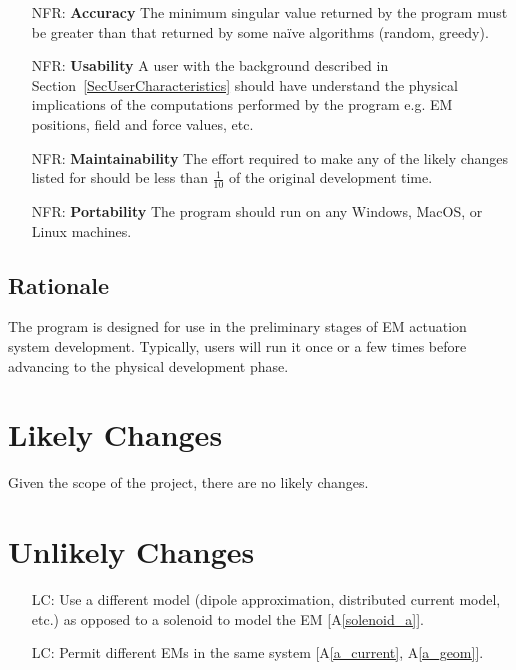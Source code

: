 \documentclass[12pt]{article}
\newcounter{nfrnum} %
\newcounter{lcnum} %
\begin{document}
\begin{itemize}

\item[NFR\refstepcounter{nfrnum}\thenfrnum \label{NFR_Accuracy}:]
  \textbf{Accuracy} The minimum singular value returned by the program must be greater than that returned by some naïve algorithms (random, greedy). 

\item[NFR\refstepcounter{nfrnum}\thenfrnum \label{NFR_Usability}:] \textbf{Usability}
    A user with the background described in Section~\ref{SecUserCharacteristics} should 
    have understand the physical implications of the computations performed by the program e.g. EM positions, field and force values, etc. 

\item[NFR\refstepcounter{nfrnum}\thenfrnum \label{NFR_Maintainability}:]
  \textbf{Maintainability} The effort required to make any of the likely
    changes listed for \progname{} should be less than $\frac{1}{10}$ of the original
    development time.

\item[NFR\refstepcounter{nfrnum}\thenfrnum \label{NFR_Portability}:]
  \textbf{Portability} The program should run on any Windows, MacOS, or Linux machines. 
\end{itemize}

\subsection{Rationale}
The program is designed for use in the preliminary stages of EM actuation system development. Typically, users will run it once or a few times before advancing to the physical development phase. 

\section{Likely Changes}    
\noindent
Given the scope of the project, there are no likely changes. 

\section{Unlikely Changes}    

\noindent \begin{itemize}

\item[LC\refstepcounter{lcnum}\thelcnum\label{LC_meaningfulLabel}:] Use a different model (dipole approximation, distributed current model, etc.) as opposed to a solenoid to model the EM [A\ref{solenoid_a}].

\item[LC\refstepcounter{lcnum}\thelcnum\label{LC_meaningfulLabel}:] Permit different EMs in the same system [A\ref{a_current}, A\ref{a_geom}]. 

\end{itemize}
\end{document}
